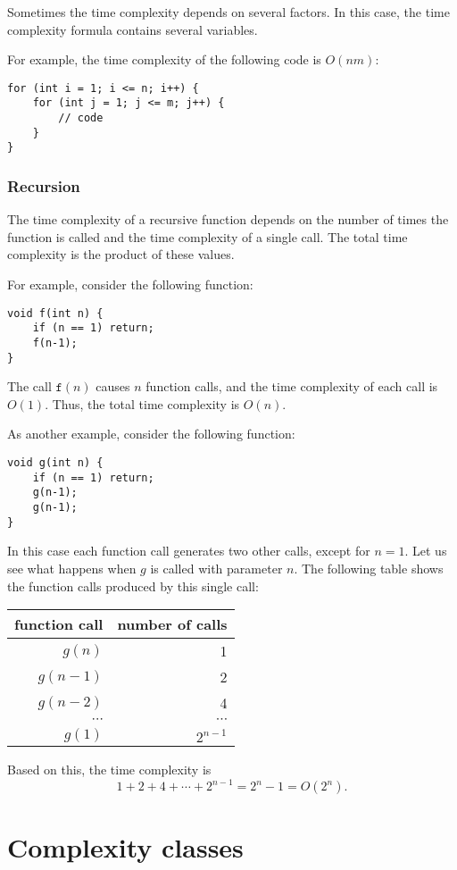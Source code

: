 Sometimes the time complexity depends on
several factors.
In this case, the time complexity formula
contains several variables.

For example, the time complexity of the
following code is $O(nm)$:

\begin{lstlisting}
for (int i = 1; i <= n; i++) {
    for (int j = 1; j <= m; j++) {
        // code
    }
}
\end{lstlisting}

\subsubsection*{Recursion}

The time complexity of a recursive function
depends on the number of times the function is called
and the time complexity of a single call.
The total time complexity is the product of
these values.

For example, consider the following function:
\begin{lstlisting}
void f(int n) {
    if (n == 1) return;
    f(n-1);
}
\end{lstlisting}
The call $\texttt{f}(n)$ causes $n$ function calls,
and the time complexity of each call is $O(1)$.
Thus, the total time complexity is $O(n)$.

As another example, consider the following function:
\begin{lstlisting}
void g(int n) {
    if (n == 1) return;
    g(n-1);
    g(n-1);
}
\end{lstlisting}
In this case each function call generates two other
calls, except for $n=1$.
Let us see what happens when $g$ is called
with parameter $n$.
The following table shows the function calls
produced by this single call:
\begin{center}
\begin{tabular}{rr}
function call & number of calls \\
\hline
$g(n)$ & 1 \\
$g(n-1)$ & 2 \\
$g(n-2)$ & 4 \\
$\cdots$ & $\cdots$ \\
$g(1)$ & $2^{n-1}$ \\
\end{tabular}
\end{center}
Based on this, the time complexity is
\[1+2+4+\cdots+2^{n-1} = 2^n-1 = O(2^n).\]

\section{Complexity classes}

